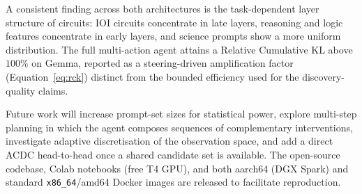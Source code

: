 A consistent finding across both architectures is the task-dependent layer
structure of circuits: IOI circuits concentrate in late layers, reasoning and
logic features concentrate in early layers, and science prompts show a more
uniform distribution. The full multi-action agent attains a Relative Cumulative
KL above $100\%$ on Gemma, reported as a steering-driven amplification factor
(Equation~\ref{eq:rck}) distinct from the bounded efficiency used for the
discovery-quality claims.

Future work will increase prompt-set sizes for statistical power, explore
multi-step planning in which the agent composes sequences of complementary
interventions, investigate adaptive discretisation of the observation space, and
add a direct ACDC head-to-head once a shared candidate set is available. The
open-source codebase, Colab notebooks (free T4 GPU), and both aarch64 (DGX Spark)
and standard \texttt{x86\_64}/amd64 Docker images are released to facilitate
reproduction.

